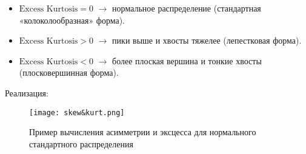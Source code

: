 \begin{itemize}
    \item $\text{Excess Kurtosis} = 0$ $\rightarrow$ нормальное распределение (стандартная «колоколообразная» форма).
    \item $\text{Excess Kurtosis} > 0$ $\rightarrow$ пики выше и хвосты тяжелее (лепестковая форма).
    \item $\text{Excess Kurtosis} < 0$ $\rightarrow$ более плоская вершина и тонкие хвосты (плосковершинная форма).
\end{itemize}

Реализация:

\begin{figure}[H]
    \centering
    \texttt{[image: skew\&kurt.png]}
    \caption{Пример вычисления асимметрии и эксцесса для нормального стандартного распределения}
\end{figure}


\endinput